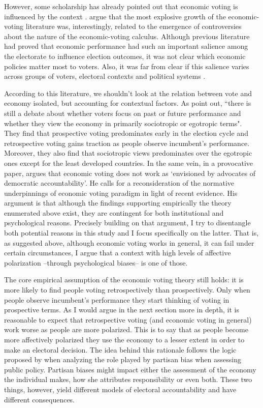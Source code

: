 \documentclass[a4paper, svgnames]{article}
\begin{document}
However, some scholarship has already pointed out that economic voting is influenced by the context \citep{Dorussen2002, Anderson2007, Singer2015}. \cite{Dorussen2002} argue that the most explosive growth of the economic-voting literature was, interestingly, related to the emergence of controversies about the nature of the economic-voting calculus. Although previous literature had proved that economic performance had such an important salience among the electorate to influence election outcomes, it was not clear which economic policies matter most to voters. Also, it was far from clear if this salience varies across groups of voters, electoral contexts and political systems \citep{Dorussen2002}.

According to this literature, we shouldn't look at the relation between vote and economy isolated, but accounting for contextual factors. As \citet[p. 1]{Singer2015} point out, ``there is still a debate about whether voters focus on past or future performance and whether they view the economy in primarily sociotropic or egotropic terms". They find that prospective voting predominates early in the election cycle and retrospective voting gains traction as people observe incumbent's performance. Moreover, they also find that sociotropic views predominates over the egotropic ones except for the least developed countries. In the same vein, in a provocative paper, \cite[p. 1]{Anderson2007} argues that economic voting does not work as `envisioned by advocates of democratic accountability'. He  calls for a reconsideration of the normative underpinnings of economic voting paradigm in light of recent evidence. His argument is that although the findings supporting empirically the theory enumerated above exist, they are contingent for both institutional and psychological reasons. Precisely building on that argument, I try to disentangle both potential reasons in this study and I focus specifically on the latter. That is, as suggested above, although economic voting works in general, it can fail under certain circumstances, I argue that a context with high levels of affective polarization --through psychological biases-- is one of those.

The core empirical assumption of the economic voting theory still holds: it is more likely to find people voting retrospectively than prospectively. Only when people observe incumbent's performance they start thinking of voting in prospective terms. As I would argue in the next section more in depth, it is reasonable to expect that retrospective voting (and economic voting in general) work worse as people are more polarized. This is to say that as people become more affectively polarized they use the economy to a lesser extent in order to make an electoral decision. The idea behind this rationale follows the logic proposed by \citet*{tilleyGovernmentBlameExperimental2011a} when analyzing the role played by partisan bias when assessing public policy. Partisan biases might impact either the assessment of the economy the individual makes, how she attributes responsibility or even both. These two things, however, yield different models of electoral accountability and have different consequences.
\end{document}
